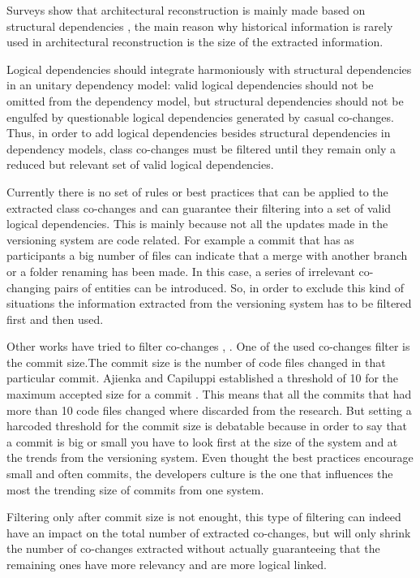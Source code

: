 \documentclass[12pt,a4paper,oneside]{report}
\begin{document}
Surveys show that architectural reconstruction is mainly made based on structural dependencies \cite{Shtern:2012:CMS:2332427.2332428} \cite{sar}, the main reason why historical information is rarely used in architectural reconstruction is the size of the extracted information.

Logical dependencies should integrate harmoniously with structural dependencies in an unitary dependency model: valid logical dependencies should not be omitted from the dependency model, but structural dependencies should not be engulfed by questionable logical dependencies generated by casual co-changes.  
Thus, in order to add logical dependencies besides structural dependencies in dependency models, class co-changes must be filtered until they remain only a reduced but relevant set of valid logical dependencies. 

Currently there is no set of rules or best practices that can be applied to the extracted class co-changes and can guarantee their filtering into a set of valid logical dependencies.
This is mainly because not all the updates made in the versioning system are code related. For example a commit that has as participants a big number of files can indicate that a merge with another branch or a folder renaming has been made. In this case, a series of irrelevant co-changing pairs of entities can be introduced. So, in order to exclude this kind of situations the information extracted from the versioning system has to be filtered first and then used.

Other works have tried to filter co-changes \cite{Oliva:2011:ISL:2067853.2068086}, \cite{DBLP:journals/jss/AjienkaC17}. One of the used co-changes filter is the commit size.The commit size is the number of code files changed in that particular commit. 
Ajienka and Capiluppi established a threshold of 10 for the maximum accepted size for a commit \cite{DBLP:journals/jss/AjienkaC17}. This means that all the commits that had more than 10 code files changed where discarded from the research. But setting a harcoded threshold for the commit size is debatable because in order to say that a commit is big or small you have to look first at the size of the system and at the trends from the versioning system. Even thought the best practices encourage small and often commits, the developers culture is the one that influences the most the trending size of commits from one system.

Filtering only after commit size is not enought, this type of filtering can indeed have an impact on the total number of extracted co-changes, but will only shrink the number of co-changes extracted without actually guaranteeing that the remaining ones have more relevancy and are more logical linked.
\end{document}
